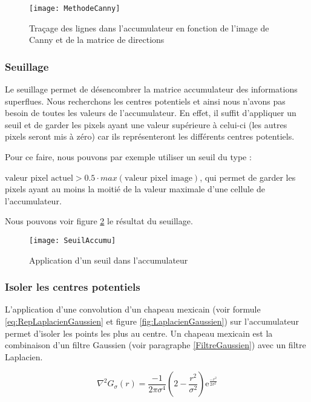\begin{figure}[h]
  \centering
  \texttt{[image: MethodeCanny]}
  \caption{Traçage des lignes dans l’accumulateur en fonction de l’image de Canny et de la matrice de directions}
  \label{fig:MethodeCanny}
\end{figure}

\subsubsection{Seuillage}

Le seuillage permet de désencombrer la matrice accumulateur des informations superflues. Nous recherchons les centres potentiels et ainsi nous n’avons pas besoin de toutes les valeurs de l’accumulateur. En effet, il suffit d’appliquer un seuil et de garder les pixels ayant une valeur supérieure à celui-ci (les autres pixels seront mis à zéro) car ils représenteront les différents centres potentiels. 

Pour ce faire, nous pouvons par exemple utiliser un seuil du type :

$\text{valeur pixel actuel} > 0.5 \cdot max(\text{valeur pixel image})$, qui permet de garder les pixels ayant au moins la moitié de la valeur maximale d’une cellule de l’accumulateur.

Nous pouvons voir figure \ref{fig:SeuilAccumu} le résultat du seuillage.

\begin{figure}[h]
  \centering
  \texttt{[image: SeuilAccumu]}
  \caption{Application d’un seuil dans l’accumulateur}
  \label{fig:SeuilAccumu}
\end{figure}

\subsubsection{Isoler les centres potentiels}

L’application d’une convolution d’un chapeau mexicain (voir formule \eqref{eq:RepLaplacienGaussien} et figure \ref{fig:LaplacienGaussien}) sur l’accumulateur permet d’isoler les points les plus au centre. Un chapeau mexicain est la combinaison d’un filtre Gaussien (voir paragraphe \ref{FiltreGaussien}) avec un filtre Laplacien.

\begin{equation}
\nabla^2G_\sigma(r) = \frac{-1}{2\pi\sigma^4}(2-\frac{r^2}{\sigma^2}) \mathrm{e}^{\frac{-r^2}{2\sigma^2}}
\label{eq:RepLaplacienGaussien}
\end{equation}

